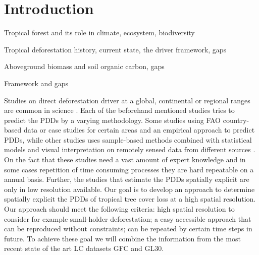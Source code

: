 \chapter{Introduction}
\label{ch:introduction}
	 Tropical forest and its role in climate, ecosystem, biodiversity

	 Tropical deforestation history, current state, the driver framework, gaps

	 Aboveground biomass and soil organic carbon, gaps

	 Framework and gaps


	Studies on direct deforestation driver at a global, continental or regional ranges are common in science \citep{Curtis2018,Hosonuma2012,Sy2015,Austin2019,Boucher2011,DeFries2010,Zalles2018,Carter2018,Ickowitz2015,Meyfroidt2013}. Each of the beforehand mentioned studies tries to predict the \acp{PDD} by a varying methodology. Some studies using \ac{FAO} country-based data or case studies for certain areas and an empirical approach to predict \acp{PDD}, while other studies uses sample-based methods combined with statistical models and visual interpretation on remotely sensed data from different sources \citep{Hosonuma2012,Sy2015,Austin2019,Curtis2018}. On the fact that these studies need a vast amount of expert knowledge and in some cases repetition of time consuming processes they are hard repeatable on a annual basis. Further, the studies that estimate the \acp{PDD} spatially explicit are only in low resolution available. Our goal is to develop an approach to determine spatially explicit the \acp{PDD} of tropical tree cover loss at a high spatial resolution. Our approach should meet the following criteria: high spatial resolution to consider for example small-holder deforestation; a easy accessible approach that can be reproduced without constraints; can be repeated by certain time steps in future. To achieve these goal we will combine the information from the most recent state of the art \ac{LC} datasets \ac{GFC} and \ac{GL30}.

